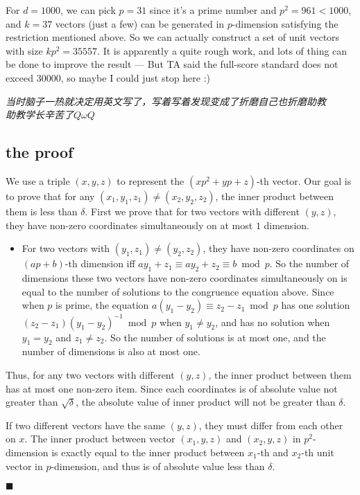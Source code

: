 \documentclass[12pt]{article}%
\begin{document}
For $d = 1000$, we can pick $p = 31$ since it's a prime number and $p^2 = 961 < 1000$, and $k = 37$ vectors (just a few) can be generated in $p$-dimension satisfying the restriction mentioned above. So we can actually construct a set of unit vectors with size $kp^2 = 35557$. It is apparently a quite rough work, and lots of thing can be done to improve the result --- But TA said the full-score standard does not exceed $30000$, so maybe I could just stop here :)

\begin{center}
	{\color{white} \textit{当时脑子一热就决定用英文写了，写着写着发现变成了折磨自己也折磨助教\\助教学长辛苦了$Q\omega Q$}}
\end{center}

\subsection*{the proof}

We use a triple $(x, y, z)$ to represent the $(xp^2 + yp + z)$-th vector. Our goal is to prove that for any $(x_1, y_1, z_1) \neq (x_2, y_2, z_2)$, the inner product between them is less than $\delta$. First we prove that for two vectors with different $(y, z)$, they have non-zero coordinates simultaneously on at most $1$ dimension.

\begin{itemize}
	\item For two vectors with $(y_1, z_1) \neq (y_2, z_2)$, they have non-zero coordinates on $(ap + b)$-th dimension iff $ay_1 + z_1 \equiv ay_2 + z_2 \equiv b \bmod p$. So the number of dimensions these two vectors have non-zero coordinates simultaneously on is equal to the number of solutions to the congruence equation above. Since when $p$ is prime, the equation $a(y_1 - y_2) \equiv z_2 - z_1 \bmod p$ has one solution $(z_2 - z_1)(y_1 - y_2)^{-1} \bmod p$ when $y_1 \neq y_2$, and has no solution when $y_1 = y_2$ and $z_1 \neq z_2$. So the number of solutions is at most one, and the number of dimensions is also at most one.
\end{itemize}

Thus, for any two vectors with different $(y, z)$, the inner product between them has at most one non-zero item. Since each coordinates is of absolute value not greater than $\sqrt{\delta}$, the absolute value of inner product will not be greater than $\delta$.

If two different vectors have the same $(y, z)$, they must differ from each other on $x$. The inner product between vector $(x_1, y, z)$ and $(x_2, y, z)$ in $p^2$-dimension is exactly equal to the inner product between $x_1$-th and $x_2$-th unit vector in $p$-dimension, and thus is of absolute value less than $\delta$.{\hfill $\blacksquare$\par}
\end{document}
